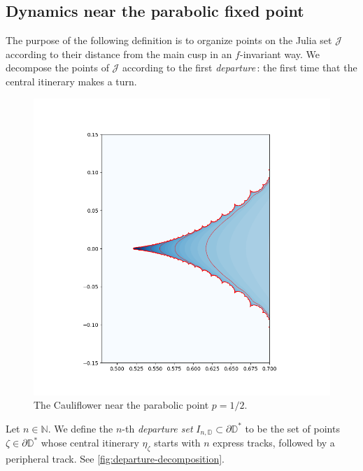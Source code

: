 \subsection{Dynamics near the parabolic fixed point}

The purpose of the following definition is to organize points on the Julia set $\mathcal J$ according to their distance from the main cusp in an $f$-invariant way. We decompose the points of $\mathcal J$ according to the first \emph{departure}\,: the first time that the central itinerary makes a turn.

\begin{figure}
    \centering
    \includegraphics[width=\textwidth]{cauliflower_equipotentials2.png}
    \caption{The Cauliflower near the parabolic point $p=1/2$.}
    \label{fig:my_figure}
\end{figure}

\begin{definition}

Let $n \in \mathbb N$. We define the $n$-th \emph{departure set} $I_{n, \mathbb D} \subset \partial \mathbb D ^*$ to be the set of points $\zeta \in \partial \mathbb D^*$ whose central itinerary $\eta_{\zeta}$ starts with $n$ express tracks, followed by a peripheral track.
See \cref{fig:departure-decomposition}.
\end{definition}

